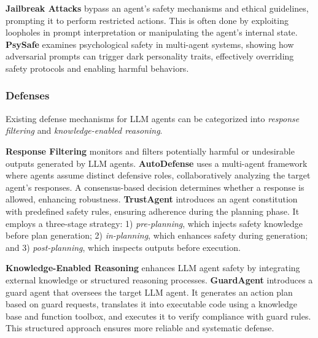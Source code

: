 \textbf{Jailbreak Attacks} bypass an agent's safety mechanisms and ethical guidelines, prompting it to perform restricted actions. This is often done by exploiting loopholes in prompt interpretation or manipulating the agent's internal state. \textbf{PsySafe} \cite{zhang2024psysafe} examines psychological safety in multi-agent systems, showing how adversarial prompts can trigger dark personality traits, effectively overriding safety protocols and enabling harmful behaviors.

\subsubsection{Defenses}
Existing defense mechanisms for LLM agents can be categorized into \emph{response filtering} and \emph{knowledge-enabled reasoning}.

\textbf{Response Filtering} monitors and filters potentially harmful or undesirable outputs generated by LLM agents. \textbf{AutoDefense} \cite{zeng2024autodefense} uses a multi-agent framework where agents assume distinct defensive roles, collaboratively analyzing the target agent's responses. A consensus-based decision determines whether a response is allowed, enhancing robustness. 
\textbf{TrustAgent} \cite{hua2024trustagent} introduces an agent constitution with predefined safety rules, ensuring adherence during the planning phase. It employs a three-stage strategy: 1) \emph{pre-planning}, which injects safety knowledge before plan generation; 2) \emph{in-planning}, which enhances safety during generation; and 3) \emph{post-planning}, which inspects outputs before execution.

\textbf{Knowledge-Enabled Reasoning} enhances LLM agent safety by integrating external knowledge or structured reasoning processes. \textbf{GuardAgent} \cite{xiang2024guardagent} introduces a guard agent that oversees the target LLM agent. It generates an action plan based on guard requests, translates it into executable code using a knowledge base and function toolbox, and executes it to verify compliance with guard rules. This structured approach ensures more reliable and systematic defense.


